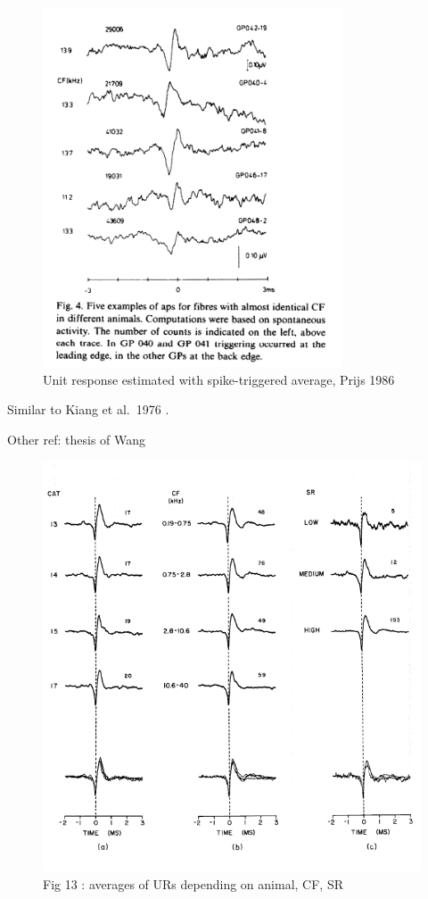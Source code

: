 \documentclass[]{article}
\begin{document}
\begin{figure}
\centering
\includegraphics[width=3.5in,height=\textheight]{./figures/unit_response.png}
\caption{Unit response estimated with spike-triggered average, Prijs
1986 \citep{Prijs1986}}
\end{figure}

Similar to Kiang et al.~1976 \citep{Kiang1976}.

Other ref: thesis of Wang \citep{Wang1979}

\begin{figure}
\centering
\includegraphics[width=5.5in,height=\textheight]{./figures/URs.png}
\caption{Fig 13 \citep{Wang1979} : averages of URs depending on animal,
CF, SR}
\end{figure}
\end{document}
